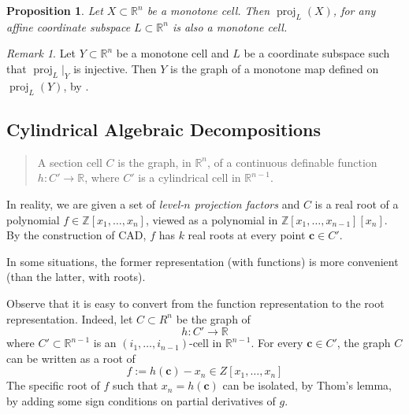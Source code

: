 \documentclass[
]{book}
\newtheorem{proposition}{Proposition}[chapter]
\theoremstyle{definition}
\theoremstyle{definition}
\theoremstyle{definition}
\theoremstyle{definition}
\theoremstyle{remark}
\newtheorem*{remark}{Remark}
\begin{document}
\begin{proposition}
\citep[Theorem 10]{bgv13}
Let \(X \subset \mathbb{R}^n\) be a monotone cell. Then \(\operatorname{proj}_{L}(X)\), for any affine coordinate subspace \(L \subset \mathbb{R}^n\) is also a monotone cell.
\end{proposition}

\begin{remark}
\citep[Remark 2.11]{bgv15}
Let \(Y \subset \mathbb{R}^n\) be a monotone cell and \(L\) be a coordinate subspace such that \(\operatorname{proj}_L\vert_Y\) is injective.
Then \(Y\) is the graph of a monotone map defined on \(\operatorname{proj}_L(Y)\), by \citep[Theorem 7 and Corollary 5]{bgv13}.
\end{remark}

\hypertarget{cylindrical-algebraic-decompositions}{%
\subsection{Cylindrical Algebraic Decompositions}\label{cylindrical-algebraic-decompositions}}

\begin{quote}
A section cell \(C\) is the graph, in \(\mathbb{R}^n\), of a continuous definable function \(h : C' \to \mathbb{R}\), where \(C'\) is a cylindrical cell in \(\mathbb{R}^{n-1}\).
\end{quote}

In reality, we are given a set of \emph{level-\(n\) projection factors} and \(C\) is a real root of a polynomial \(f \in \mathbb{Z}[x_1,\ldots,x_n]\), viewed as a polynomial in \(\mathbb{Z}[x_1,\ldots,x_{n-1}][x_n]\). By the construction of CAD, \(f\) has \(k\) real roots at every point \(\mathbf{c} \in C'\).

In some situations, the former representation (with functions) is more convenient (than the latter, with roots).

Observe that it is easy to convert from the function representation to the root representation. Indeed, let \(C\subset R^{n}\) be the graph of
\[h : C' \to \mathbb{R}\]
where \(C' \subset \mathbb{R}^{n-1}\) is an \((i_1,\ldots,i_{n-1})\)-cell in \(\mathbb{R}^{n-1}\). For every \(\mathbf{c} \in C'\), the graph \(C\) can be written as a root of
\[
f := h(\mathbf{c}) - x_n \in Z[x_1,\ldots,x_n]
\]
The specific root of \(f\) such that \(x_n = h(\mathbf{c})\) can be isolated, by Thom's lemma, by adding some sign conditions on partial derivatives of \(g\).
\end{document}
